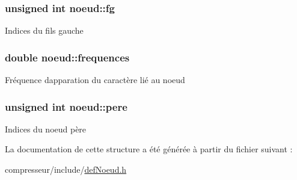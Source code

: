 \subsubsection[{\texorpdfstring{fg}{fg}}]{\setlength{\rightskip}{0pt plus 5cm}unsigned int noeud\+::fg}\hypertarget{structnoeud_ae14c26edcd37240fc9f8e3769d55d3e5}{}\label{structnoeud_ae14c26edcd37240fc9f8e3769d55d3e5}
Indices du fils gauche 
\subsubsection[{\texorpdfstring{frequences}{frequences}}]{\setlength{\rightskip}{0pt plus 5cm}double noeud\+::frequences}\hypertarget{structnoeud_a27b27306f715b45b8f8e47bb35ad3859}{}\label{structnoeud_a27b27306f715b45b8f8e47bb35ad3859}
Fréquence d\textquotesingle{}apparation du caractère lié au noeud 
\subsubsection[{\texorpdfstring{pere}{pere}}]{\setlength{\rightskip}{0pt plus 5cm}unsigned int noeud\+::pere}\hypertarget{structnoeud_aa5b03ff1fc332c2390f0324398c0ee1d}{}\label{structnoeud_aa5b03ff1fc332c2390f0324398c0ee1d}
Indices du noeud père 

La documentation de cette structure a été générée à partir du fichier suivant \+:\begin{DoxyCompactItemize}
\item 
compresseur/include/\hyperlink{compresseur_2include_2defNoeud_8h}{def\+Noeud.\+h}\end{DoxyCompactItemize}
